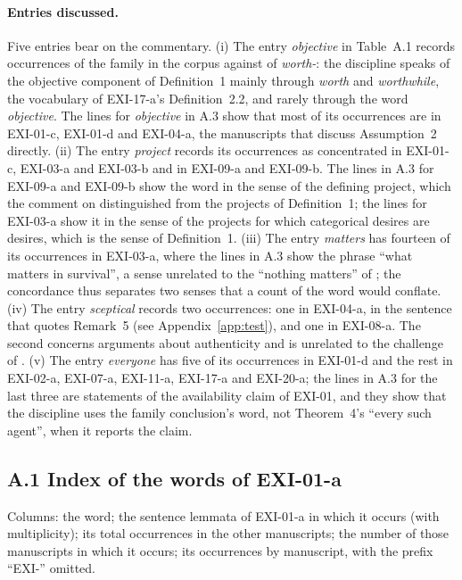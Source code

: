 \paragraph{Entries discussed.} Five entries bear on the commentary. (i) The entry \emph{objective} in Table~A.1 records \cnFamobjectiv{} occurrences of the family in the corpus against \cnFamworth{} of \textit{worth-}: the discipline speaks of the objective component of Definition~1 mainly through \emph{worth} and \emph{worthwhile}, the vocabulary of EXI-17-a's Definition~2.2, and rarely through the word \emph{objective}. The lines for \emph{objective} in A.3 show that most of its occurrences are in EXI-01-c, EXI-01-d and EXI-04-a, the manuscripts that discuss Assumption~2 directly. (ii) The entry \emph{project} records its occurrences as concentrated in EXI-01-c, EXI-03-a and EXI-03-b and in EXI-09-a and EXI-09-b. The lines in A.3 for EXI-09-a and EXI-09-b show the word in the sense of the defining project, which the comment on  distinguished from the projects of Definition~1; the lines for EXI-03-a show it in the sense of the projects for which categorical desires are desires, which is the sense of Definition~1. (iii) The entry \emph{matters} has fourteen of its occurrences in EXI-03-a, where the lines in A.3 show the phrase \enquote{what matters in survival}, a sense unrelated to the \enquote{nothing matters} of ; the concordance thus separates two senses that a count of the word would conflate. (iv) The entry \emph{sceptical} records two occurrences: one in EXI-04-a, in the sentence that quotes Remark~5 (see Appendix~\ref{app:test}), and one in EXI-08-a. The second concerns arguments about authenticity and is unrelated to the challenge of . (v) The entry \emph{everyone} has five of its occurrences in EXI-01-d and the rest in EXI-02-a, EXI-07-a, EXI-11-a, EXI-17-a and EXI-20-a; the lines in A.3 for the last three are statements of the availability claim of EXI-01, and they show that the discipline uses the family conclusion's word, not Theorem~4's \enquote{every such agent}, when it reports the claim.

\subsection*{A.1 Index of the words of EXI-01-a}

{\footnotesize Columns: the word; the sentence lemmata of EXI-01-a in which it occurs (with multiplicity); its total occurrences in the other \cnOtherMss{} manuscripts; the number of those manuscripts in which it occurs; its occurrences by manuscript, with the prefix \enquote{EXI-} omitted.\par}

